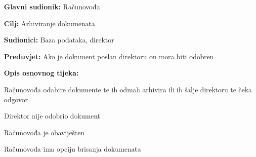 				\begin{packed_item}
					
					\item \textbf{Glavni sudionik:} Računovođa
					\item  \textbf{Cilj:} Arhiviranje dokumenata
					\item  \textbf{Sudionici:} Baza podataka, direktor
					\item  \textbf{Preduvjet:} Ako je dokument poslan direktoru on mora biti odobren
					\item  \textbf{Opis osnovnog tijeka:}
					
					\item[] \begin{packed_enum}
						
						\item Računovođa odabire dokumente te ih odmah arhivira ili ih šalje direktoru te čeka odgovor
						
					\end{packed_enum}
					\item[] \begin{packed_item}
						
						\item[2.a] Direktor nije odobrio dokument
						\item[] \begin{packed_enum}
							
							\item Računovođa je obaviješten 
							\item Računovođa ima opciju brisanja dokumenata
						\end{packed_enum}
						
					\end{packed_item}					
				\end{packed_item}
			
